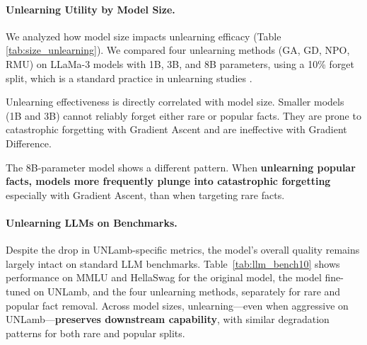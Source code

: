 \documentclass[sigconf,anonymous]{aamas}
\begin{document}
\paragraph{Unlearning Utility by Model Size.}
We analyzed how model size impacts unlearning efficacy (Table \ref{tab:size_unlearning}). We compared four unlearning methods (GA, GD, NPO, RMU) on LLaMa-3 models with 1B, 3B, and 8B parameters, using a 10\% forget split, which is a standard practice in unlearning studies \cite{tofu2024, pal2025llm}.

Unlearning effectiveness is directly correlated with model size. Smaller models (1B and 3B) cannot reliably forget either rare or popular facts. They are prone to catastrophic forgetting with Gradient Ascent and are ineffective with Gradient Difference.

The 8B-parameter model shows a different pattern. When \textbf{unlearning popular facts, models more frequently plunge into catastrophic forgetting} especially with Gradient Ascent, than when targeting rare facts.




\paragraph{Unlearning LLMs on Benchmarks.}



Despite the drop in UNLamb-specific metrics, the model’s overall quality remains largely intact on standard LLM benchmarks. Table~\ref{tab:llm_bench10} shows performance on MMLU and HellaSwag for the original model, the model fine-tuned on UNLamb, and the four unlearning methods, separately for rare and popular fact removal. Across model sizes, unlearning—even when aggressive on UNLamb—\textbf{preserves downstream capability}, with similar degradation patterns for both rare and popular splits.
\end{document}
